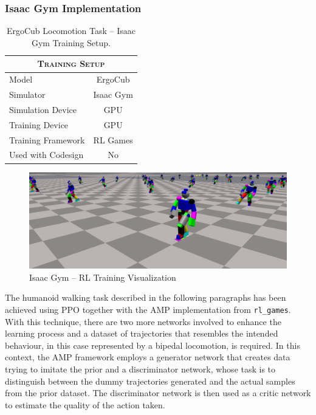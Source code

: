 \subsubsection{Isaac Gym Implementation}

\begin{table}
    \centering
    \begin{tabular}{l c}
        \toprule
        \multicolumn{2}{c}{\textsc{Training Setup}} \\
        \midrule
        Model              & ErgoCub                \\
        Simulator          & Isaac Gym              \\
        Simulation Device  & GPU                    \\
        Training Device    & GPU                    \\
        Training Framework & RL Games               \\
        Used with Codesign & No                     \\
        \bottomrule
    \end{tabular}
    \caption{ErgoCub Locomotion Task -- Isaac Gym Training Setup.}
\end{table}

\begin{figure}
    \centering
    \caption{Isaac Gym -- RL Training Visualization}
    \label{fig:isaacgymtraining}
    \includegraphics[width=.9\textwidth]{Images/stickbot_training_1.png}
\end{figure}

The humanoid walking task described in the following paragraphs has been achieved using \ac{PPO} together with the \ac{AMP} implementation from \texttt{rl\_games}. With this technique, there are two more networks involved to enhance the learning process and a dataset of trajectories that resembles the intended behaviour, in this case represented by a bipedal locomotion, is required. In this context, the AMP framework employs a generator network that creates data trying to imitate the prior and a discriminator network, whose task is to distinguish between the dummy trajectories generated and the actual samples from the prior dataset. The discriminator network is then used as a critic network to estimate the quality of the action taken.

